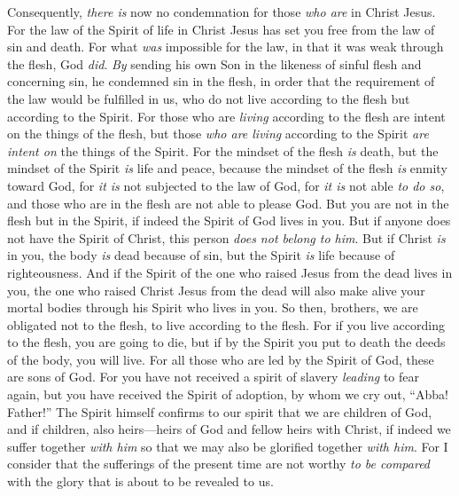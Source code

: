 \begin{biblechapter} %
 Consequently, \textit{there is} now no condemnation for those \textit{who are} in Christ Jesus.
\verse For the law of the Spirit of life in Christ Jesus has set you free from the law of sin and death.
\verse For what \textit{was} impossible for the law, in that it was weak through the flesh, God \textit{did}. \textit{By} sending his own Son in the likeness of sinful flesh and concerning sin, he condemned sin in the flesh,
\verse in order that the requirement of the law would be fulfilled in us, who do not live according to the flesh but according to the Spirit.
\verse For those who are \textit{living} according to the flesh are intent on the things of the flesh, but those \textit{who are living} according to the Spirit \textit{are intent on} the things of the Spirit.
\verse For the mindset of the flesh \textit{is} death, but the mindset of the Spirit \textit{is} life and peace,
\verse because the mindset of the flesh \textit{is} enmity toward God, for \textit{it is} not subjected to the law of God, for \textit{it is} not able \textit{to do so},
\verse and those who are in the flesh are not able to please God.
\verse But you are not in the flesh but in the Spirit, if indeed the Spirit of God lives in you. But if anyone does not have the Spirit of Christ, this person \textit{does not belong to him}.
\verse But if Christ \textit{is} in you, the body \textit{is} dead because of sin, but the Spirit \textit{is} life because of righteousness.
\verse And if the Spirit of the one who raised Jesus from the dead lives in you, the one who raised Christ Jesus from the dead will also make alive your mortal bodies through his Spirit who lives in you.
\verse So then, brothers, we are obligated not to the flesh, to live according to the flesh.
\verse For if you live according to the flesh, you are going to die, but if by the Spirit you put to death the deeds of the body, you will live.
\verse For all those who are led by the Spirit of God, these are sons of God.
\verse For you have not received a spirit of slavery \textit{leading} to fear again, but you have received the Spirit of adoption, by whom we cry out, “Abba! Father!”
\verse The Spirit himself confirms to our spirit that we are children of God,
\verse and if children, also heirs—heirs of God and fellow heirs with Christ, if indeed we suffer together \textit{with him} so that we may also be glorified together \textit{with him}.
 For I consider that the sufferings of the present time are not worthy \textit{to be compared} with the glory that is about to be revealed to us.

\end{biblechapter}
